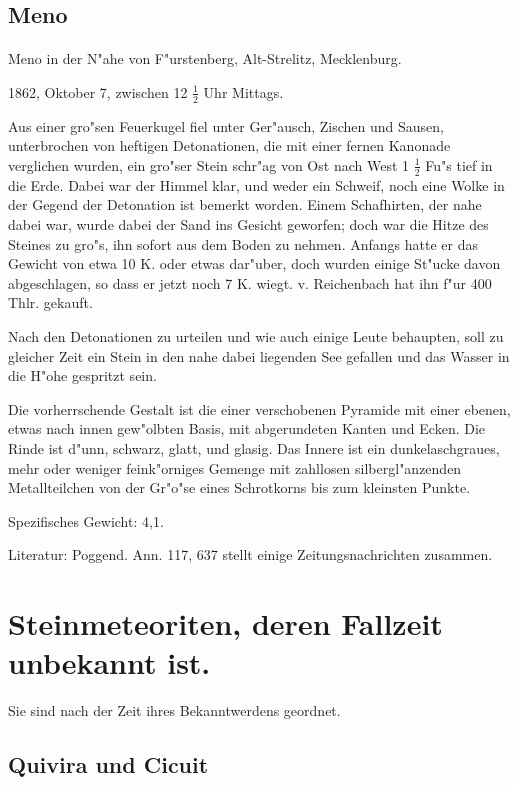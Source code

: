 \documentclass[a4paper, 11pt, oneside]{article}
\begin{document}
\subsection{Meno}
\normalsize
\paragraph{}
Meno in der N"ahe von F"urstenberg, Alt-Strelitz, Mecklenburg.

1862, Oktober 7, zwischen 12 $\frac{1}{2}$ Uhr Mittags.

Aus einer gro"sen Feuerkugel fiel unter Ger"ausch, Zischen und Sausen, unterbrochen von heftigen Detonationen, die mit einer fernen Kanonade verglichen wurden, ein gro"ser Stein schr"ag von Ost nach West 1 $\frac{1}{2}$ Fu"s tief in die Erde. Dabei war der Himmel klar, und weder ein Schweif, noch eine Wolke in der Gegend der Detonation ist bemerkt worden. Einem Schafhirten, der nahe dabei war, wurde dabei der Sand ins Gesicht geworfen; doch war die Hitze des Steines zu gro"s, ihn sofort aus dem Boden zu nehmen. Anfangs hatte er das Gewicht von etwa 10 K. oder etwas dar"uber, doch wurden einige St"ucke davon abgeschlagen, so dass er jetzt noch 7 K. wiegt. v. Reichenbach hat ihn f"ur 400 Thlr. gekauft.

Nach den Detonationen zu urteilen und wie auch einige Leute behaupten, soll zu gleicher Zeit ein Stein in den nahe dabei liegenden See gefallen und das Wasser in die H"ohe gespritzt sein.

Die vorherrschende Gestalt ist die einer verschobenen Pyramide mit einer ebenen, etwas nach innen gew"olbten Basis, mit abgerundeten Kanten und Ecken. Die Rinde ist d"unn, schwarz, glatt, und glasig. Das Innere ist ein dunkelaschgraues, mehr oder weniger feink"orniges Gemenge mit zahllosen silbergl"anzenden Metallteilchen von der Gr"o"se eines Schrotkorns bis zum kleinsten Punkte.

Spezifisches Gewicht: 4,1.

Literatur: Poggend. Ann. 117, 637 stellt einige Zeitungsnachrichten zusammen.

\section{Steinmeteoriten, deren Fallzeit unbekannt ist.}

Sie sind nach der Zeit ihres Bekanntwerdens geordnet.

\subsection{Quivira und Cicuit}
\normalsize
\end{document}
